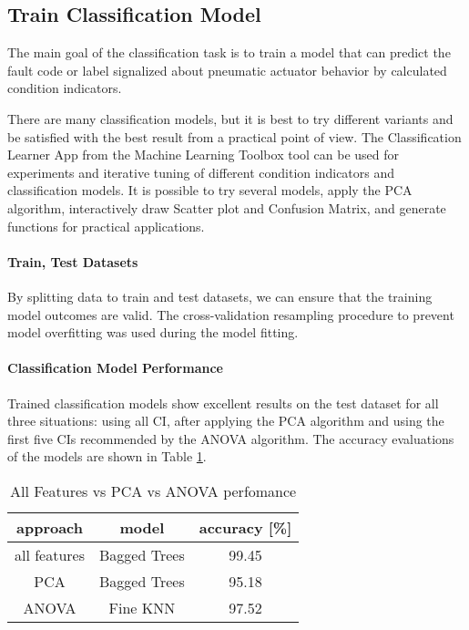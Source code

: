 \subsection{Train Classification Model}
The main goal of the classification task is to train a model that can
predict the fault code or label signalized about pneumatic actuator
behavior by calculated condition indicators.

There are many classification models, but it is best to try different
variants and be satisfied with the best result from a practical point of
view.  The Classification Learner App from the Machine Learning Toolbox
tool can be used for experiments and iterative tuning of different
condition indicators and classification models. It is possible to try
several models, apply the PCA algorithm, interactively draw Scatter plot
and Confusion Matrix, and generate functions for practical applications.

\paragraph{Train, Test Datasets} By splitting data to train and test
datasets, we can ensure that the training model outcomes are valid. The
cross-validation resampling procedure to prevent model overfitting was used
during the model fitting.

\paragraph{Classification Model Performance}


Trained classification models show excellent results on the test dataset
for all three situations: using all CI, after applying the PCA algorithm
and using the first five CIs recommended by the ANOVA algorithm.  The
accuracy evaluations of the models are shown in Table
\ref{tab:classification_perfomance}.

\begin{table}[h!]
    \centering
    \begin{tabular}{|c|c|c|}
        \hline
        \textbf{approach} & \textbf{model}     &  \textbf{accuracy [\%]} \\
        \hline
        all features      &  Bagged Trees      &  99.45  \\
        PCA               &  Bagged Trees      &  95.18  \\
        ANOVA             &  Fine KNN          &  97.52  \\
        \hline
    \end{tabular}
    \caption{All Features vs PCA vs ANOVA perfomance}
    \label{tab:classification_perfomance}
\end{table}

